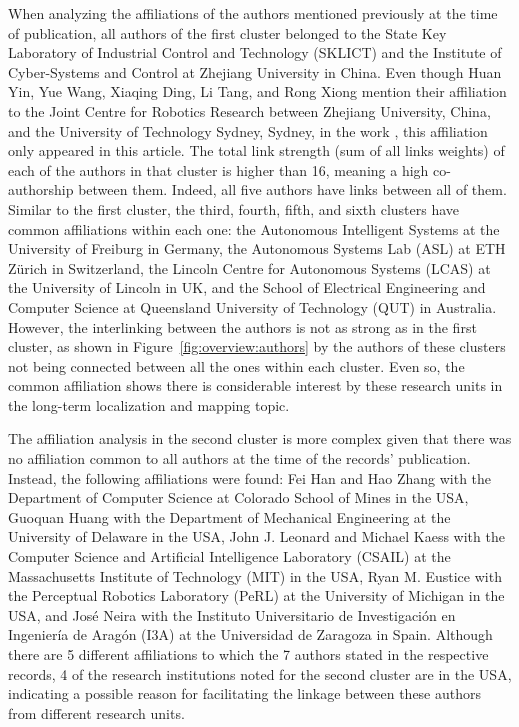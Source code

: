 When analyzing the affiliations of the authors mentioned previously at the time of publication, all authors of the first cluster belonged to the State Key Laboratory of Industrial Control and Technology (SKLICT) and the Institute of Cyber-Systems and Control at Zhejiang University in China. Even though Huan Yin, Yue Wang, Xiaqing Ding, Li Tang, and Rong Xiong mention their affiliation to the Joint Centre for Robotics Research between Zhejiang University, China, and the University of Technology Sydney, Sydney, in the work \parencite{yin-et-al:2020:2905046}, this affiliation only appeared in this article. The total link strength (sum of all links weights) of each of the authors in that cluster is higher than 16, meaning a high co-authorship between them. Indeed, all five authors have links between all of them.
Similar to the first cluster, the third, fourth, fifth, and sixth clusters have common affiliations within each one: the Autonomous Intelligent Systems at the University of Freiburg in Germany, the Autonomous Systems Lab (ASL) at ETH Zürich in Switzerland, the Lincoln Centre for Autonomous Systems (LCAS) at the University of Lincoln in UK, and the School of Electrical Engineering and Computer Science at Queensland University of Technology (QUT) in Australia.
However, the interlinking between the authors is not as strong as in the first cluster, as shown in Figure~\ref{fig:overview:authors} by the authors of these clusters not being connected between all the ones within each cluster. Even so, the common affiliation shows there is considerable interest by these research units in the long-term localization and mapping topic.

The affiliation analysis in the second cluster is more complex given that there was no affiliation common to all authors at the time of the records' publication. Instead, the following affiliations were found: Fei Han and Hao Zhang with the Department of Computer Science at Colorado School of Mines in the USA, Guoquan Huang with the Department of Mechanical Engineering at the University of Delaware in the USA, John J. Leonard and Michael Kaess with the Computer Science and Artificial Intelligence Laboratory (CSAIL) at the Massachusetts Institute of Technology (MIT) in the USA, Ryan M. Eustice with the Perceptual Robotics Laboratory (PeRL) at the University of Michigan in the USA, and José Neira with the Instituto Universitario de Investigación en Ingeniería de Aragón (I3A) at the Universidad de Zaragoza in Spain.
Although there are 5 different affiliations to which the 7 authors stated in the respective records, 4 of the research institutions noted for the second cluster are in the USA, indicating a possible reason for facilitating the linkage between these authors from different research units.

